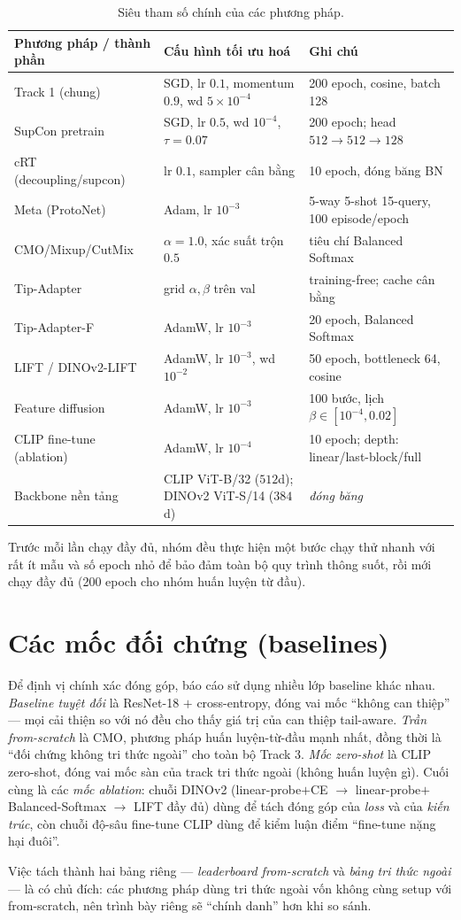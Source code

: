 \begin{table}[H]
\centering
\caption{Siêu tham số chính của các phương pháp.}
\label{tab:hparams}
\small
\begin{tabularx}{\textwidth}{l X l}
\toprule
\textbf{Phương pháp / thành phần} & \textbf{Cấu hình tối ưu hoá} & \textbf{Ghi chú} \\
\midrule
Track 1 (chung) & SGD, lr $0.1$, momentum $0.9$, wd $5\!\times\!10^{-4}$ & 200 epoch, cosine, batch 128 \\
\quad SupCon pretrain & SGD, lr $0.5$, wd $10^{-4}$, $\tau{=}0.07$ & 200 epoch; head $512\!\to\!512\!\to\!128$ \\
\quad cRT (decoupling/supcon) & lr $0.1$, sampler cân bằng & 10 epoch, đóng băng BN \\
\quad Meta (ProtoNet) & Adam, lr $10^{-3}$ & 5-way 5-shot 15-query, 100 episode/epoch \\
\quad CMO/Mixup/CutMix & $\alpha{=}1.0$, xác suất trộn $0.5$ & tiêu chí Balanced Softmax \\
\midrule
Tip-Adapter & grid $\alpha,\beta$ trên val & training-free; cache cân bằng \\
Tip-Adapter-F & AdamW, lr $10^{-3}$ & 20 epoch, Balanced Softmax \\
LIFT / DINOv2-LIFT & AdamW, lr $10^{-3}$, wd $10^{-2}$ & 50 epoch, bottleneck 64, cosine \\
Feature diffusion & AdamW, lr $10^{-3}$ & 100 bước, lịch $\beta\in[10^{-4},0.02]$ \\
CLIP fine-tune (ablation) & AdamW, lr $10^{-4}$ & 10 epoch; depth: linear/last-block/full \\
\midrule
Backbone nền tảng & CLIP ViT-B/32 ($512$d); DINOv2 ViT-S/14 ($384$d) & \emph{đóng băng} \\
\bottomrule
\end{tabularx}
\end{table}

Trước mỗi lần chạy đầy đủ, nhóm đều thực hiện một bước chạy thử nhanh với rất ít mẫu và số epoch
nhỏ để bảo đảm toàn bộ quy trình thông suốt, rồi mới chạy đầy đủ (200 epoch cho nhóm huấn luyện từ
đầu).

\section{Các mốc đối chứng (baselines)}

Để định vị chính xác đóng góp, báo cáo sử dụng nhiều lớp baseline khác nhau. \emph{Baseline tuyệt
đối} là ResNet-18 $+$ cross-entropy, đóng vai mốc ``không can thiệp'' --- mọi cải thiện so với nó
đều cho thấy giá trị của can thiệp tail-aware. \emph{Trần from-scratch} là CMO, phương pháp
huấn luyện-từ-đầu mạnh nhất, đồng thời là ``đối chứng không tri thức ngoài'' cho toàn bộ Track 3.
\emph{Mốc zero-shot} là CLIP zero-shot, đóng vai mốc sàn của track tri thức ngoài (không huấn luyện
gì). Cuối cùng là các \emph{mốc ablation}: chuỗi DINOv2 (linear-probe$+$CE $\to$
linear-probe$+$Balanced-Softmax $\to$ LIFT đầy đủ) dùng để tách đóng góp của \emph{loss} và của
\emph{kiến trúc}, còn chuỗi độ-sâu fine-tune CLIP dùng để kiểm luận điểm ``fine-tune nặng hại
đuôi''.

Việc tách thành hai bảng riêng --- \emph{leaderboard from-scratch} và \emph{bảng tri thức ngoài}
--- là có chủ đích: các phương pháp dùng tri thức ngoài vốn không cùng setup với from-scratch, nên
trình bày riêng sẽ ``chính danh'' hơn khi so sánh.
